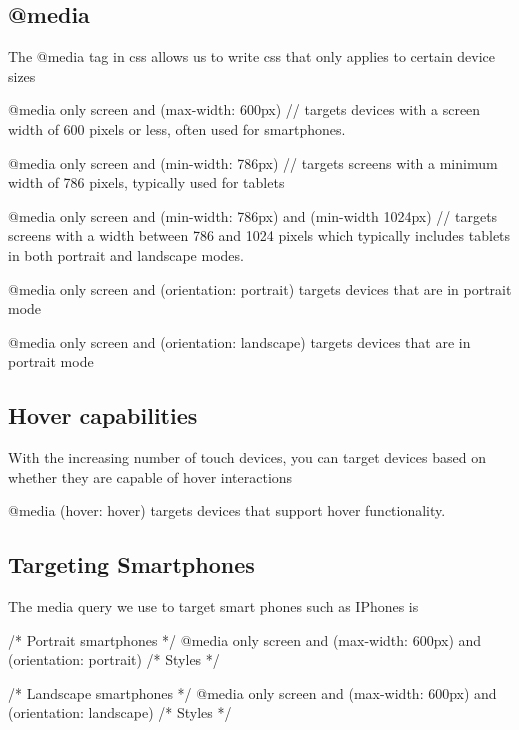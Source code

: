 \documentclass{report}
\begin{document}
    \subsection{@media}
    \bigbreak \noindent 
    \begin{concept}
        The @media tag in css allows us to write css that only applies to certain device sizes        
    \end{concept}
    \bigbreak \noindent 
    \begin{csscode}

        @media only screen and (max-width: 600px) {
            // targets devices with a screen width of 600 pixels or less, often used for smartphones.
        }

        @media only screen and (min-width: 786px) {
            // targets screens with a minimum width of 786 pixels, typically used for tablets
        }

        @media only screen and (min-width: 786px) and (min-width 1024px) {
            // targets screens with a width between 786 and 1024 pixels  which typically includes tablets in both portrait and landscape modes.
        }


        @media only screen and (orientation: portrait) {
            targets devices that are in portrait mode
        }

        @media only screen and (orientation: landscape) {
            targets devices that are in portrait mode
        }
    \end{csscode}

    \pagebreak \bigbreak \noindent 
    \subsection{Hover capabilities}
    \bigbreak \noindent 
    \begin{concept}
        With the increasing number of touch devices, you can target devices based on whether they are capable of hover interactions
        \bigbreak \noindent 
        \begin{csscode}
            @media (hover: hover) {
                targets devices that support hover functionality.
            }
        \end{csscode}
    \end{concept}

    \bigbreak \noindent 
    \subsection{Targeting Smartphones}
    \bigbreak \noindent 
    The media query we use to target smart phones such as IPhones is
    \bigbreak \noindent 
    \begin{csscode}
    /* Portrait smartphones */
    @media only screen and (max-width: 600px) and (orientation: portrait) {
        /* Styles */
    }

    /* Landscape smartphones */
    @media only screen and (max-width: 600px) and (orientation: landscape) {
        /* Styles */
    } 
    \end{csscode}
\end{document}
